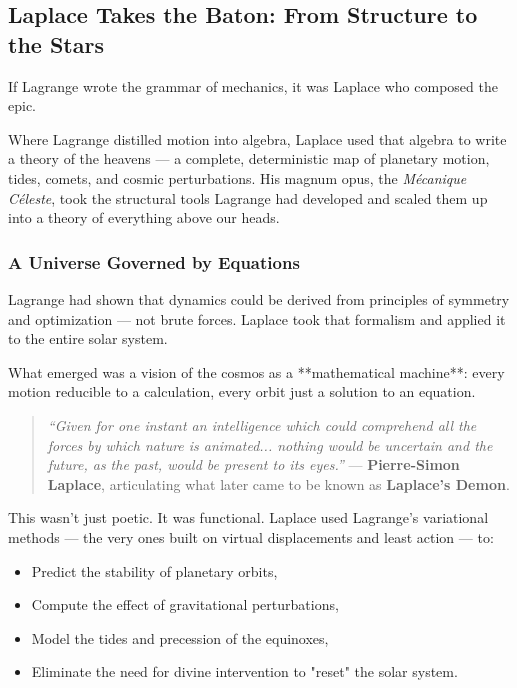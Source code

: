\subsection{Laplace Takes the Baton: From Structure to the Stars}

If Lagrange wrote the grammar of mechanics, it was Laplace who composed the epic.

Where Lagrange distilled motion into algebra, Laplace used that algebra to write a theory of the heavens — a complete, deterministic map of planetary motion, tides, comets, and cosmic perturbations. His magnum opus, the \textit{Mécanique Céleste}, took the structural tools Lagrange had developed and scaled them up into a theory of everything above our heads.

\subsubsection*{A Universe Governed by Equations}

Lagrange had shown that dynamics could be derived from principles of symmetry and optimization — not brute forces. Laplace took that formalism and applied it to the entire solar system.

What emerged was a vision of the cosmos as a **mathematical machine**: every motion reducible to a calculation, every orbit just a solution to an equation.

\begin{quote}
\textit{“Given for one instant an intelligence which could comprehend all the forces by which nature is animated... nothing would be uncertain and the future, as the past, would be present to its eyes.”}  
— \textbf{Pierre-Simon Laplace}, articulating what later came to be known as \textbf{Laplace’s Demon}.
\end{quote}

This wasn’t just poetic. It was functional. Laplace used Lagrange’s variational methods — the very ones built on virtual displacements and least action — to:
\begin{itemize}
    \item Predict the stability of planetary orbits,
    \item Compute the effect of gravitational perturbations,
    \item Model the tides and precession of the equinoxes,
    \item Eliminate the need for divine intervention to "reset" the solar system.
\end{itemize}

